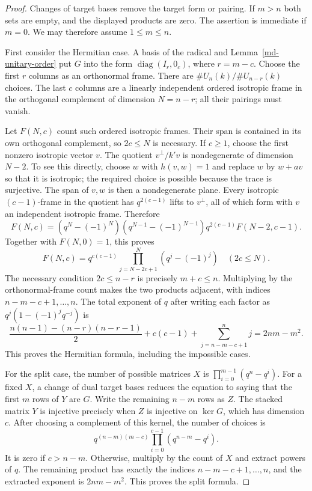 \begin{proof}
Changes of target bases remove the target form or pairing.
If $m>n$ both sets are empty, and the displayed products are zero.
The assertion is immediate if $m=0$. We may therefore assume
$1\leq m\leq n$.

First consider the Hermitian case. A basis of the radical and
Lemma~\ref{md-unitary-order} put $G$ into the form
$\operatorname{diag}(I_r,0_c)$, where $r=m-c$.
Choose the first $r$ columns as an orthonormal frame. There are
$\#U_n(k)/\#U_{n-r}(k)$ choices. The last $c$ columns are a
linearly independent ordered isotropic frame in the orthogonal
complement of dimension $N=n-r$; all their pairings must vanish.

Let $F(N,c)$ count such ordered isotropic frames. Their span is
contained in its own orthogonal complement, so $2c\leq N$ is
necessary. If $c\geq1$, choose the first nonzero isotropic vector
$v$. The quotient $v^\perp/k'v$ is nondegenerate of dimension
$N-2$. To see this directly, choose $w$ with $h(v,w)=1$ and
replace $w$ by $w+av$ so that it is isotropic; the required
choice is possible because the trace is surjective. The span
of $v,w$ is then a nondegenerate plane.
Every isotropic $(c-1)$-frame in the quotient has
$q^{2(c-1)}$ lifts to $v^\perp$, all of which form with $v$
an independent isotropic frame. Therefore
\[
 F(N,c)=(q^N-(-1)^N)(q^{N-1}-(-1)^{N-1})
                         q^{2(c-1)}F(N-2,c-1).
\]
Together with $F(N,0)=1$, this proves
\[
 F(N,c)=q^{c(c-1)}
           \prod_{j=N-2c+1}^{N}(q^j-(-1)^j)
                  \quad(2c\leq N).
\]
The necessary condition $2c\leq n-r$ is precisely $m+c\leq n$.
Multiplying by the orthonormal-frame count makes the two products
adjacent, with indices $n-m-c+1,\ldots,n$. The total exponent of
$q$ after writing each factor as $q^j(1-(-1)^jq^{-j})$ is
\[
 \frac{n(n-1)-(n-r)(n-r-1)}2+c(c-1)
             +\sum_{j=n-m-c+1}^{n}j
                       =2nm-m^2.
\]
This proves the Hermitian formula, including the impossible cases.

For the split case, the number of possible matrices $X$ is
$\prod_{i=0}^{m-1}(q^n-q^i)$. For a fixed $X$, a change of
dual target bases reduces the equation to saying that the first
$m$ rows of $Y$ are $G$. Write the remaining $n-m$ rows as $Z$.
The stacked matrix $Y$ is injective precisely when $Z$ is
injective on $\ker G$, which has dimension $c$. After choosing
a complement of this kernel, the number of choices is
\[
           q^{(n-m)(m-c)}\prod_{i=0}^{c-1}(q^{n-m}-q^i).
\]
It is zero if $c>n-m$. Otherwise, multiply by the count of $X$
and extract powers of $q$. The remaining product has exactly
the indices $n-m-c+1,\ldots,n$, and the extracted exponent is
$2nm-m^2$. This proves the split formula.
\end{proof}


